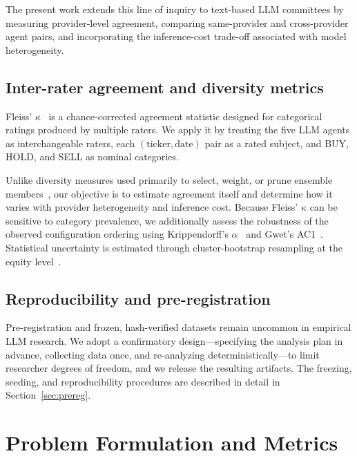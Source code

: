 \documentclass{ieeeaccess}
\begin{document}
The present work extends this line of inquiry to text-based LLM committees by
measuring provider-level agreement, comparing same-provider and cross-provider
agent pairs, and incorporating the inference-cost trade-off associated with
model heterogeneity.

\subsection{Inter-rater agreement and diversity metrics}
Fleiss' $\kappa$~\cite{fleiss1971} is a chance-corrected agreement statistic
designed for categorical ratings produced by multiple raters. We apply it by
treating the five LLM agents as interchangeable raters, each
$(\mathrm{ticker},\mathrm{date})$ pair as a rated subject, and BUY, HOLD, and
SELL as nominal categories.

Unlike diversity measures used primarily to select, weight, or prune ensemble
members~\cite{tekin2024topla}, our objective is to estimate agreement itself and
determine how it varies with provider heterogeneity and inference cost. Because
Fleiss' $\kappa$ can be sensitive to category prevalence, we additionally assess
the robustness of the observed configuration ordering using Krippendorff's
$\alpha$~\cite{krippendorff2019} and Gwet's AC1~\cite{gwet2008}. Statistical
uncertainty is estimated through cluster-bootstrap resampling at the equity
level~\cite{efron1993}.

\subsection{Reproducibility and pre-registration}
Pre-registration and frozen, hash-verified datasets remain uncommon in empirical
LLM research. We adopt a confirmatory design---specifying the analysis plan in
advance, collecting data once, and re-analyzing deterministically---to limit
researcher degrees of freedom, and we release the resulting artifacts. The
freezing, seeding, and reproducibility procedures are described in detail in
Section~\ref{sec:prereg}.

\section{Problem Formulation and Metrics}
\end{document}
